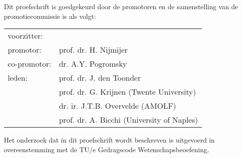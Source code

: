 \newpage
\thispagestyle{empty}

\noindent
Dit proefschrift is goedgekeurd door de promotoren en de samenstelling van de promotiecommissie is als volgt:\\[7mm]

\noindent
\begin{tabular}{@{}l p{9.8cm}}
voorzitter:                 &                   \\
promotor:                   &   prof. dr. H. Nijmijer \\
co-promotor:                &   dr. A.Y. Pogromsky \\
leden:                      &   prof. dr. J. den Toonder \\
                            &   prof. dr. G. Krijnen (Twente University) \\
                            &   dr. ir. J.T.B. Overvelde (AMOLF) \\
                            &   prof. dr. A. Bicchi (University of Naples) \\
\end{tabular}

\vfill
\noindent
Het onderzoek dat in dit proefschrift wordt beschreven is uitgevoerd in overeenstemming met de TU/e Gedragscode Wetenschapsbeoefening.
